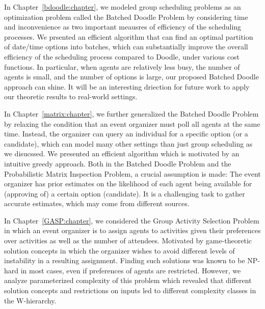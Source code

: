 \label{discussion:chapter}

In Chapter~\ref{bdoodle:chapter}, we modeled group scheduling problems as an optimization problem called the Batched Doodle Problem by considering time and inconvenience as two important meausres of efficiency of the scheduling processes. We prsented an efficient algorithm that can find an optimal partition of date/time options into batches, which can substantially improve the overall efficiency of the scheduling process compared to Doodle, under various cost functions. In particular, when agents are relatively less busy, the number of agents is small, and the number of options is large, our proposed Batched Doodle approach can shine. It will be an interesting driection for future work to apply our theoretic results to real-world settings.

In Chapter~\ref{matrix:chapter}, we further generalized the Batched Doodle Problem by relaxing the condition that an event organizer must poll all agents at the same time. Instead, the organizer can query an individual for a specific option (or a candidate), which can model many other settings than just group scheduling as we disucssed. We presented an efficient algorithm which is motivated by an intuitive greedy approach. Both in the Batched Doodle Problem and the Probabilistic Matrix Inspection Problem, a crucial assumption is made: The event organizer has prior estimates on the likelihood of each agent being available for (approving of) a certain option (candidate). It is a challenging task to gather accurate estimates, which may come from different sources. 

In Chapter~\ref{GASP:chapter}, we considered the Group Activity Selection Problem in which an event organizer is to assign agents to activities given their preferences over activities as well as the number of attendees. Motivated by game-theoretic solution concepts in which the organizer wishes to avoid different levels of instability in a resulting assignment. Finding such solutions was known to be NP-hard in most cases, even if preferences of agents are restricted. However, we analyze parameterized complexity of this problem which revealed that different solution concepts and restrictions on inputs led to different complexity classes in the W-hierarchy. 

